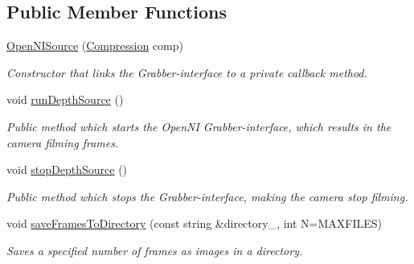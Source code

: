 \subsection*{Public Member Functions}
\begin{DoxyCompactItemize}
\item 
\hypertarget{class_open_n_i_source_ad7c59826245812024bee0a541f948c91}{\hyperlink{class_open_n_i_source_ad7c59826245812024bee0a541f948c91}{Open\+N\+I\+Source} (\hyperlink{_compression_strategy_8h_a56a83bf6847f4801f4205eb4be237ccf}{Compression} comp)}\label{class_open_n_i_source_ad7c59826245812024bee0a541f948c91}

\begin{DoxyCompactList}\small\item\em Constructor that links the Grabber-\/interface to a private callback method. \end{DoxyCompactList}\item 
\hypertarget{class_open_n_i_source_ad0d3202f60119589e1d8b5ba94e49e59}{void \hyperlink{class_open_n_i_source_ad0d3202f60119589e1d8b5ba94e49e59}{run\+Depth\+Source} ()}\label{class_open_n_i_source_ad0d3202f60119589e1d8b5ba94e49e59}

\begin{DoxyCompactList}\small\item\em Public method which starts the Open\+N\+I Grabber-\/interface, which results in the camera filming frames. \end{DoxyCompactList}\item 
\hypertarget{class_open_n_i_source_aa92ab17d6933c1f5447f0f581815a4e6}{void \hyperlink{class_open_n_i_source_aa92ab17d6933c1f5447f0f581815a4e6}{stop\+Depth\+Source} ()}\label{class_open_n_i_source_aa92ab17d6933c1f5447f0f581815a4e6}

\begin{DoxyCompactList}\small\item\em Public method which stops the Grabber-\/interface, making the camera stop filming. \end{DoxyCompactList}\item 
void \hyperlink{class_open_n_i_source_a2d6f642492a63ebb1cef48e927d52a06}{save\+Frames\+To\+Directory} (const string \&directory\+\_\+, int N=M\+A\+X\+F\+I\+L\+E\+S)
\begin{DoxyCompactList}\small\item\em Saves a specified number of frames as images in a directory. \end{DoxyCompactList}\end{DoxyCompactItemize}
